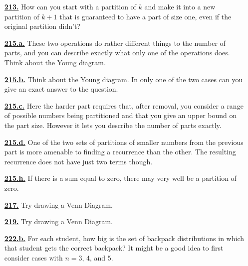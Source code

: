 \documentclass[10pt,]{book}
\theoremstyle{plain}
\theoremstyle{definition}
\theoremstyle{definition}
\theoremstyle{definition}
\numberwithin{equation}{chapter}
\begin{document}
\begin{itemize}[itemsep=1em]
\hypertarget{a-213}{}\item[\textbf{\hyperref[activity-206]{213.}}]
\hypertarget{p-1136}{}%
How can you start with a partition of \(k\) and make it into a new partition of \(k+1\) that is guaranteed to have a part of size one, even if the original partition didn't?%

\hypertarget{a-215.a}{}\item[\textbf{\hyperref[task-217]{215.a.}}]
\hypertarget{p-1144}{}%
These two operations do rather different things to the number of parts, and you can describe exactly what only one of the operations does. Think about the Young diagram.%

\hypertarget{a-215.b}{}\item[\textbf{\hyperref[task-218]{215.b.}}]
\hypertarget{p-1147}{}%
Think about the Young diagram. In only one of the two cases can you give an exact answer to the question.%

\hypertarget{a-215.c}{}\item[\textbf{\hyperref[task-219]{215.c.}}]
\hypertarget{p-1150}{}%
Here the harder part requires that, after removal, you consider a range of possible numbers being partitioned and that you give an upper bound on the part size. However it lets you describe the number of parts exactly.%

\hypertarget{a-215.d}{}\item[\textbf{\hyperref[task-220]{215.d.}}]
\hypertarget{p-1154}{}%
One of the two sets of partitions of smaller numbers from the previous part is more amenable to finding a recurrence than the other. The resulting recurrence does not have just two terms though.%

\hypertarget{a-215.h}{}\item[\textbf{\hyperref[task-224]{215.h.}}]
\hypertarget{p-1162}{}%
If there is a sum equal to zero, there may very well be a partition of zero.%

\hypertarget{a-217}{}\item[\textbf{\hyperref[twosetintersection]{217.}}]
\hypertarget{p-1169}{}%
Try drawing a Venn Diagram.%

\hypertarget{a-219}{}\item[\textbf{\hyperref[threesetintersection]{219.}}]
\hypertarget{p-1175}{}%
Try drawing a Venn Diagram.%

\hypertarget{a-222.b}{}\item[\textbf{\hyperref[task-226]{222.b.}}]
\hypertarget{p-1187}{}%
For each student, how big is the set of backpack distributions in which that student gets the correct backpack?  It might be a good idea to first consider cases with \(n=3\), \(4\), and \(5\).%


\end{itemize}
\end{document}
